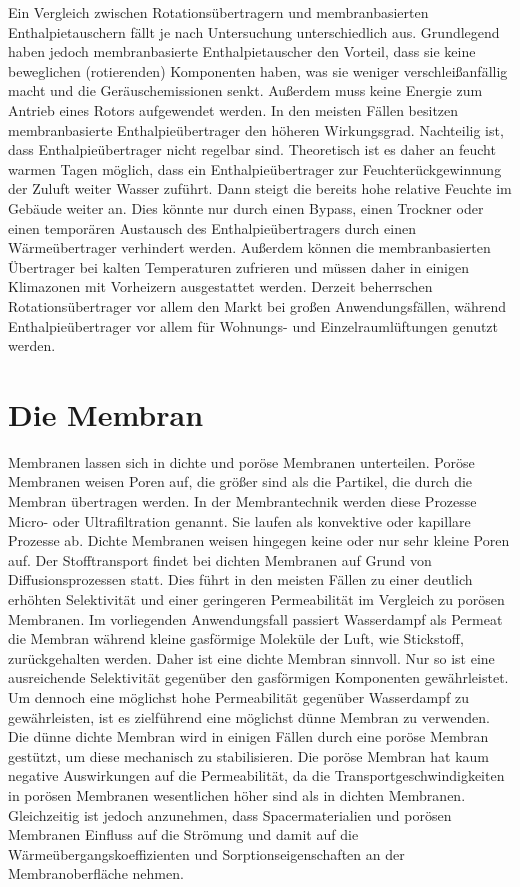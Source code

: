 \begin{normalsize}
\begin{LARGE}
Ein Vergleich zwischen Rotationsübertragern und membranbasierten Enthalpietauschern fällt je nach Untersuchung unterschiedlich aus. Grundlegend haben jedoch membranbasierte Enthalpietauscher den Vorteil, dass sie keine beweglichen (rotierenden) Komponenten haben, was sie weniger verschleißanfällig macht und die Geräuschemissionen senkt. Außerdem muss keine Energie zum Antrieb eines Rotors aufgewendet werden. In den meisten Fällen besitzen membranbasierte Enthalpieübertrager den höheren Wirkungsgrad. \cite{JustoAlonso.2015}  %
Nachteilig ist, dass Enthalpieübertrager nicht regelbar sind. Theoretisch
ist es daher an feucht warmen Tagen möglich, dass ein Enthalpieübertrager zur Feuchterückgewinnung der Zuluft weiter Wasser zuführt. Dann steigt die bereits hohe relative Feuchte im Gebäude weiter an. Dies könnte nur durch einen Bypass, einen Trockner oder einen temporären Austausch des Enthalpieübertragers durch einen Wärmeübertrager verhindert werden. Außerdem können die membranbasierten Übertrager bei kalten Temperaturen zufrieren und müssen daher in einigen Klimazonen mit Vorheizern ausgestattet werden. Derzeit beherrschen Rotationsübertrager vor allem den Markt bei großen Anwendungsfällen, während Enthalpieübertrager vor allem für Wohnungs- und Einzelraumlüftungen genutzt werden.  


\section{Die Membran}

Membranen lassen sich in dichte und poröse Membranen unterteilen. 
Poröse Membranen weisen Poren auf, die größer sind als die Partikel, die durch die Membran übertragen werden. In der Membrantechnik werden diese Prozesse Micro- oder Ultrafiltration genannt. Sie laufen als konvektive oder kapillare Prozesse ab. 
Dichte Membranen weisen hingegen keine oder nur sehr kleine Poren auf.  Der Stofftransport findet bei dichten Membranen auf Grund von Diffusionsprozessen statt. 
Dies führt in den meisten Fällen zu einer deutlich erhöhten Selektivität und einer geringeren Permeabilität im Vergleich zu porösen Membranen. Im vorliegenden Anwendungsfall passiert Wasserdampf als Permeat die Membran während kleine gasförmige Moleküle der Luft, wie Stickstoff, zurückgehalten werden. Daher ist eine dichte Membran sinnvoll. Nur so ist eine ausreichende Selektivität gegenüber den gasförmigen Komponenten gewährleistet. \cite{ThomasMelin.2007}
Um dennoch eine möglichst hohe Permeabilität gegenüber Wasserdampf zu gewährleisten, ist es zielführend eine möglichst dünne Membran zu verwenden. 
Die dünne dichte Membran wird in einigen Fällen durch eine poröse Membran gestützt, um diese mechanisch zu stabilisieren. Die poröse Membran hat kaum negative Auswirkungen auf die Permeabilität, da die Transportgeschwindigkeiten in porösen Membranen wesentlichen höher sind als in dichten Membranen. Gleichzeitig ist jedoch anzunehmen, dass Spacermaterialien und porösen Membranen Einfluss auf die Strömung und damit auf die Wärmeübergangskoeffizienten und Sorptionseigenschaften an der Membranoberfläche nehmen. \cite{Shrivastava.2008}  %


\end{LARGE}
\end{normalsize}
